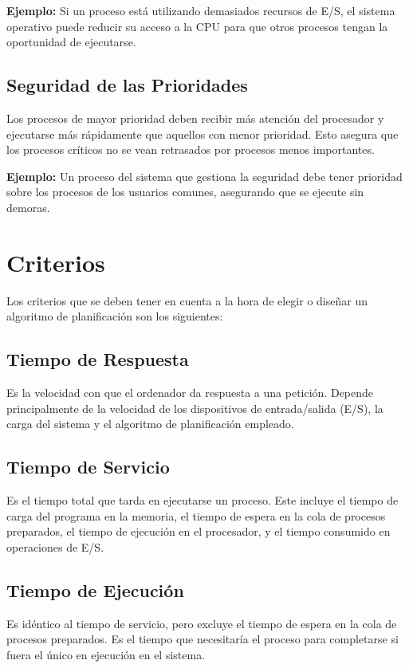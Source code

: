 \textbf{Ejemplo:} Si un proceso está utilizando demasiados recursos de E/S, el sistema operativo puede reducir su acceso a la CPU para que otros procesos tengan la oportunidad de ejecutarse.

\subsection{Seguridad de las Prioridades}
Los procesos de mayor prioridad deben recibir más atención del procesador y ejecutarse más rápidamente que aquellos con menor prioridad. Esto asegura que los procesos críticos no se vean retrasados por procesos menos importantes.

\textbf{Ejemplo:} Un proceso del sistema que gestiona la seguridad debe tener prioridad sobre los procesos de los usuarios comunes, asegurando que se ejecute sin demoras.


\section{Criterios}

Los criterios que se deben tener en cuenta a la hora de elegir o diseñar un algoritmo de planificación son los siguientes:

\subsection{Tiempo de Respuesta}
Es la velocidad con que el ordenador da respuesta a una petición. Depende principalmente de la velocidad de los dispositivos de entrada/salida (E/S), la carga del sistema y el algoritmo de planificación empleado.

\subsection{Tiempo de Servicio}
Es el tiempo total que tarda en ejecutarse un proceso. Este incluye el tiempo de carga del programa en la memoria, el tiempo de espera en la cola de procesos preparados, el tiempo de ejecución en el procesador, y el tiempo consumido en operaciones de E/S.

\subsection{Tiempo de Ejecución}
Es idéntico al tiempo de servicio, pero excluye el tiempo de espera en la cola de procesos preparados. Es el tiempo que necesitaría el proceso para completarse si fuera el único en ejecución en el sistema.

